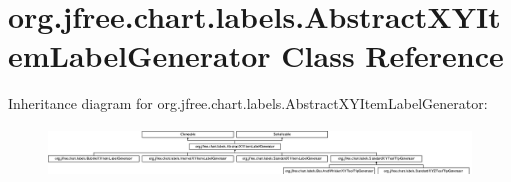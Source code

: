 \hypertarget{classorg_1_1jfree_1_1chart_1_1labels_1_1_abstract_x_y_item_label_generator}{}\section{org.\+jfree.\+chart.\+labels.\+Abstract\+X\+Y\+Item\+Label\+Generator Class Reference}
\label{classorg_1_1jfree_1_1chart_1_1labels_1_1_abstract_x_y_item_label_generator}
Inheritance diagram for org.\+jfree.\+chart.\+labels.\+Abstract\+X\+Y\+Item\+Label\+Generator\+:\begin{figure}[H]
\begin{center}
\leavevmode
\includegraphics[height=1.287356cm]{classorg_1_1jfree_1_1chart_1_1labels_1_1_abstract_x_y_item_label_generator}
\end{center}
\end{figure}
